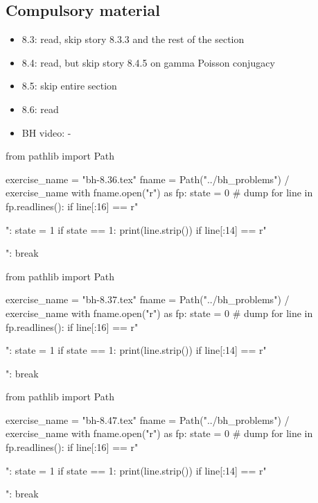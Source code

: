 \subsection{Compulsory material}
\label{sec:compulsory-material}


\begin{itemize}
\item 8.3: read, skip story 8.3.3 and the rest of the section
\item 8.4: read, but skip story 8.4.5 on gamma Poisson conjugacy
\item 8.5: skip entire section
\item 8.6: read
\item BH video: -
\end{itemize}

\begin{pycode}
from pathlib import Path

exercise_name = "bh-8.36.tex"
fname = Path("../bh_problems") / exercise_name
with fname.open("r") as fp:
    state = 0  # dump
    for line in fp.readlines():
        if line[:16] == r"\begin{exercise}":
            state = 1
        if state == 1:
            print(line.strip())
        if line[:14] == r"\end{exercise}":
            break
\end{pycode}


\begin{pycode}
from pathlib import Path

exercise_name = "bh-8.37.tex"
fname = Path("../bh_problems") / exercise_name
with fname.open("r") as fp:
    state = 0  # dump
    for line in fp.readlines():
        if line[:16] == r"\begin{exercise}":
            state = 1
        if state == 1:
            print(line.strip())
        if line[:14] == r"\end{exercise}":
            break
\end{pycode}

\begin{pycode}
from pathlib import Path

exercise_name = "bh-8.47.tex"
fname = Path("../bh_problems") / exercise_name
with fname.open("r") as fp:
    state = 0  # dump
    for line in fp.readlines():
        if line[:16] == r"\begin{exercise}":
            state = 1
        if state == 1:
            print(line.strip())
        if line[:14] == r"\end{exercise}":
            break
\end{pycode}

